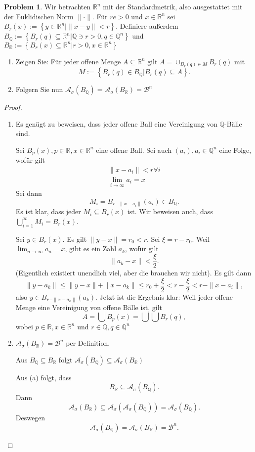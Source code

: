 \documentclass[prb,12pt]{revtex4-2}
\theoremstyle{definition}
\newtheorem{Problem}{Problem}
\theoremstyle{definition}
\newenvironment{parts}{\begin{enumerate}[label=(\alph*)]}{\end{enumerate}}
\newcommand{\R}{\mathbb{R}}
\newcommand{\Q}{\mathbb{Q}}
\begin{document}
\begin{Problem}
	Wir betrachten $\R^n$ mit der Standardmetrik, also ausgestattet mit der Euklidischen Norm $\|\cdot\|$. F\"{u}r $re>0$ und $x\in \R^n$ sei $B_r(x):=\left\{ y\in \R^n |\|x-y\|<r \right\} $. Definiere außerdem $B_\Q := \left\{ B_r(q)\subseteq \R^n | \Q \ni r > 0, q \in \Q^n \right\} $ und $B_\R :=\left\{ B_r(x)\subseteq \R^n | r > 0, x \in \R^n \right\} $ 
	\begin{parts}
	\item Zeigen Sie: F\"{u}r jeder offene Menge $A\subseteq \R^n$ gilt $A=\cup_{B_r(q)\in M}B_r(q)$ mit
		\[
		M:= \left\{ B_r(q)\in B_\Q| B_r(q)\subseteq A \right\} 
		.\]
	\item Folgern Sie nun $\mathcal A_\sigma (B_\Q)=\mathcal A_\sigma(B_\R)=\mathcal{B}^n$
	\end{parts}
\end{Problem}

\begin{proof}
\begin{parts}
\item Es genügt zu beweisen, dass jeder offene Ball eine Vereinigung von $\Q$-Bälle sind.

	Sei $B_p(x), p\in \R, x\in \R^n$ eine offene Ball. Sei auch $(a_i), a_i\in \Q^n$ eine Folge, wof\"{u}r gilt
\begin{gather*}
	\|x-a_i\|<r \forall i\\
	\lim_{i \to \infty} a_i=x
\end{gather*}
Sei dann
\[
	M_i=B_{r-\|x-a_i\|}(a_i)\in B_\Q
.\] 
Es ist klar, dass jeder $M_i\subseteq B_r(x)$ ist. Wir beweisen auch, dass $\bigcup_{i=1} ^\infty M_i=B_r(x)$.

Sei $y\in B_r(x)$. Es gilt $\|y-x\|=r_0<r$. Sei $\xi=r-r_0$. Weil $\lim_{n \to \infty} a_n=x$, gibt es ein Zahl $a_k$, wof\"{u}r gilt
\[
\|a_k-x\|<\frac{\xi}{2}
.\] 
(Eigentlich existiert unendlich viel, aber die brauchen wir nicht). Es gilt dann
\[
\|y-a_k\|\le \|y-x\|+\|x-a_k\|\le r_0+\frac{\xi}{2}<r-\frac{\xi}{2}<r-\|x-a_i\|
,\] 
also $y\in B_{r-\|x-a_k\|}(a_k)$. Jetzt ist die Ergebnis klar: Weil jeder offene Menge eine Vereinigung von offene B\"{a}lle ist, gilt
\[
A=\bigcup B_p(x)= \bigcup \bigcup B_r(q)
,\] 
wobei $ p\in \R, x\in \R^n$ und $r\in \Q, q\in \Q^n$

\item $\mathcal A_\sigma\left( B_\R \right) =\mathcal B^n$ per Definition. 

	Aus $B_\Q\subseteq B_\R$ folgt $\mathcal A_\sigma\left( B_\Q \right)  \subseteq \mathcal A_\sigma\left( B_\R \right) $

Aus (a) folgt, dass
\[
B_\R\subseteq \mathcal A_\sigma\left( B_\Q \right) 
.\] 
Dann
\[
\mathcal A_\sigma\left( B_\R \right) \subseteq \mathcal A_\sigma\left( \mathcal A_\sigma\left( B_\Q \right)  \right) =\mathcal A_\sigma\left( B_\Q \right) 
.\]
Deswegen
\[
	\mathcal A_\sigma\left( B_\Q \right) =\mathcal A_\sigma\left( B_\R \right) =\mathcal B^n
.\] 
\end{parts}
\end{proof}
\end{document}
